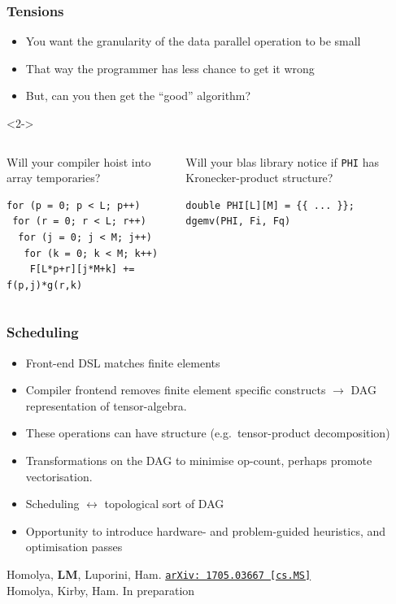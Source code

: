 \documentclass[presentation]{beamer}
\newcommand{\arxivlink}[2]{%
  \href{http://www.arxiv.org/abs/#1}%
  {\texttt{arXiv:\,#1\,[#2]}}%
}
\begin{document}
\begin{frame}[fragile]
  \frametitle{Tensions}
  \begin{itemize}
  \item You want the granularity of the data parallel operation to be
    small
  \item That way the programmer has less chance to get it wrong
  \item But, can you then get the ``good'' algorithm?
  \end{itemize}
  \hspace{0.5\baselineskip}
  \begin{uncoverenv}<2->
    \begin{columns}
      \begin{column}{0.5\textwidth}
        Will your compiler hoist into array temporaries?
\begin{verbatim}
for (p = 0; p < L; p++)
 for (r = 0; r < L; r++)
  for (j = 0; j < M; j++)
   for (k = 0; k < M; k++)
    F[L*p+r][j*M+k] += f(p,j)*g(r,k)
\end{verbatim}
    \end{column}
    \begin{column}{0.5\textwidth}
      Will your blas library notice if \texttt{PHI} has
      Kronecker-product structure?
\begin{verbatim}
double PHI[L][M] = {{ ... }};
dgemv(PHI, Fi, Fq)
\end{verbatim}
    \end{column}
  \end{columns}
\end{uncoverenv}
\end{frame}
\begin{frame}
  \frametitle{Scheduling}
  \begin{itemize}
  \item Front-end DSL matches finite elements
  \item Compiler frontend removes finite element specific constructs $\rightarrow$
    DAG representation of tensor-algebra.
  \item These operations can have structure (e.g.~tensor-product
    decomposition)
  \item Transformations on the DAG to minimise op-count, perhaps
    promote vectorisation.
  \item Scheduling $\leftrightarrow$ topological sort of DAG
  \item Opportunity to introduce hardware- and problem-guided
    heuristics, and optimisation passes
  \end{itemize}
  \begin{flushright}
    {\scriptsize Homolya, \textbf{LM}, Luporini,
      Ham. \arxivlink{1705.03667}{cs.MS}\nocite{Homolya:2017} \\

      Homolya, Kirby, Ham.  In preparation}
  \end{flushright}
\end{frame}
\end{document}
